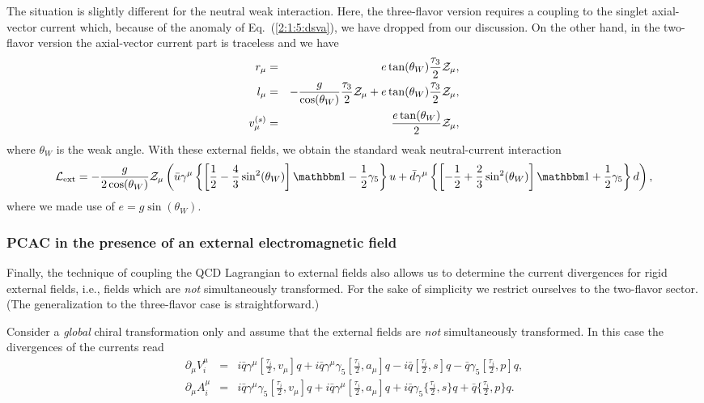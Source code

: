 \documentclass[twoside,12pt]{article}
\begin{document}
   The situation is slightly different for the neutral weak interaction.
Here, the three-flavor version requires a coupling to the singlet axial-vector
current which, because of the anomaly of Eq.\ (\ref{2:1:5:dsva}), we have
dropped from our discussion.
   On the other hand, in the two-flavor version the axial-vector current part
is traceless and we have
\begin{eqnarray}
\label{2:1:6:rlz}
r_\mu&=&e \tan(\theta_W) \frac{\tau_3}{2} {\cal Z}_\mu,\nonumber\\
l_\mu&=&-\frac{g}{\cos(\theta_W)}\frac{\tau_3}{2} {\cal Z}_\mu+
e \tan(\theta_W) \frac{\tau_3}{2} {\cal Z}_\mu,
\nonumber\\
v_\mu^{(s)}&=&\frac{e\tan(\theta_W)}{2}{\cal Z}_\mu,
\end{eqnarray}
where  $\theta_W$ is the weak angle.
   With these external fields, we obtain the standard weak neutral-current
interaction
\begin{displaymath}
{\cal L}_{\rm ext}=-\frac{g}{2\cos(\theta_W)}{\cal Z}_\mu\left(
\bar{u}\gamma^\mu\left\{\left[\frac{1}{2}-\frac{4}{3}\sin^2(\theta_W)\right]{\mathbbm 1}
-\frac{1}{2}\gamma_5\right\}u+\bar{d}\gamma^\mu\left\{\left[-\frac{1}{2}
+\frac{2}{3}\sin^2(\theta_W)\right]{\mathbbm 1}
+\frac{1}{2}\gamma_5\right\}d\right),
\end{displaymath}
where we made use of $e=g\sin(\theta_W)$.

\subsubsection{PCAC in the presence of an external electromagnetic field}
\label{subsec_pcacpeef}
   Finally, the technique of coupling the QCD Lagrangian to external fields
also allows us to determine the current divergences for rigid external fields,
i.e., fields which are {\em not} simultaneously transformed.
   For the sake of simplicity we restrict ourselves to the two-flavor sector.
   (The generalization to the three-flavor case is straightforward.)

   Consider a {\em global} chiral transformation only and assume that
the external fields are {\em not} simultaneously transformed.
   In this case the divergences of the currents
read \cite{Fuchs:2003vw}
\begin{eqnarray}
\label{2:1:7:divv}
\partial_\mu V^\mu_i&=&i\bar{q}\gamma^\mu[\frac{\tau_i}{2},v_\mu]q
+i\bar{q}\gamma^\mu\gamma_5[\frac{\tau_i}{2},a_\mu]q
-i\bar{q}[\frac{\tau_i}{2},s]q-\bar{q}\gamma_5[\frac{\tau_i}{2},p]q,\\
\label{2:1:7:diva}
\partial_\mu A^\mu_i&=&i\bar{q}\gamma^\mu\gamma_5[\frac{\tau_i}{2},v_\mu]q
+i\bar{q}\gamma^\mu[\frac{\tau_i}{2},a_\mu]q
+i\bar{q}\gamma_5\{\frac{\tau_i}{2},s\}q
+\bar{q}\{\frac{\tau_i}{2},p\}q.
\end{eqnarray}
\end{document}
